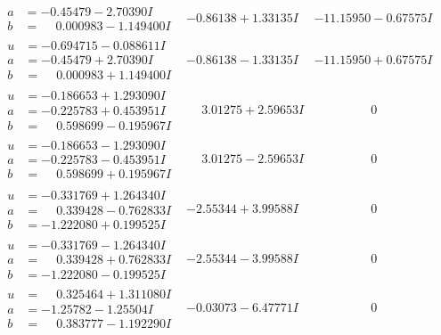 \documentclass[1p]{elsarticle_modified}
\theoremstyle{definition}
\begin{document}
$$\begin{array}{c|c|c}
\begin{aligned}
a &= -0.45479 - 2.70390 I \\
b &= \phantom{-}0.000983 - 1.149400 I\end{aligned}
 & -0.86138 + 1.33135 I & -11.15950 - 0.67575 I \\ \hline\begin{aligned}
u &= -0.694715 - 0.088611 I \\
a &= -0.45479 + 2.70390 I \\
b &= \phantom{-}0.000983 + 1.149400 I\end{aligned}
 & -0.86138 - 1.33135 I & -11.15950 + 0.67575 I \\ \hline\begin{aligned}
u &= -0.186653 + 1.293090 I \\
a &= -0.225783 + 0.453951 I \\
b &= \phantom{-}0.598699 - 0.195967 I\end{aligned}
 & \phantom{-}3.01275 + 2.59653 I & \phantom{-0.000000 } 0 \\ \hline\begin{aligned}
u &= -0.186653 - 1.293090 I \\
a &= -0.225783 - 0.453951 I \\
b &= \phantom{-}0.598699 + 0.195967 I\end{aligned}
 & \phantom{-}3.01275 - 2.59653 I & \phantom{-0.000000 } 0 \\ \hline\begin{aligned}
u &= -0.331769 + 1.264340 I \\
a &= \phantom{-}0.339428 - 0.762833 I \\
b &= -1.222080 + 0.199525 I\end{aligned}
 & -2.55344 + 3.99588 I & \phantom{-0.000000 } 0 \\ \hline\begin{aligned}
u &= -0.331769 - 1.264340 I \\
a &= \phantom{-}0.339428 + 0.762833 I \\
b &= -1.222080 - 0.199525 I\end{aligned}
 & -2.55344 - 3.99588 I & \phantom{-0.000000 } 0 \\ \hline\begin{aligned}
u &= \phantom{-}0.325464 + 1.311080 I \\
a &= -1.25782 - 1.25504 I \\
b &= \phantom{-}0.383777 - 1.192290 I\end{aligned}
 & -0.03073 - 6.47771 I & \phantom{-0.000000 } 0 \\ \hline\begin{aligned}

\end{aligned}
\end{array}$$
\end{document}
